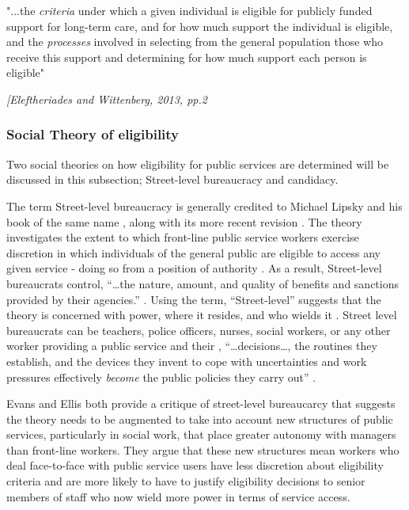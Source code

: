 \documentclass[12pt,]{report}
\begin{document}
\epigraph{"...the \emph{criteria} under which a given individual is eligible for publicly funded support for long-term care, and for how much support the individual is eligible, and the \emph{processes} involved in selecting from the general population those who receive this support and determining for how much support each person is eligible"}{\textit{[Eleftheriades and Wittenberg, 2013, pp.2}}

\subsubsection{Social Theory of eligibility}\label{subsubsec:eligibility-theory}

Two social theories on how eligibility for public services are
determined will be discussed in this subsection; Street-level
bureaucracy and candidacy.

The term Street-level bureaucracy is generally credited to Michael
Lipsky and his book of the same name \citeyearpar{RN174}, along with its
more recent revision \citep{RN430}. The theory investigates the extent
to which front-line public service workers exercise discretion in which
individuals of the general public are eligible to access any given
service - doing so from a position of authority \citep{RN430}. As a
result, Street-level bureaucrats control, ``\ldots{}the nature, amount,
and quality of benefits and sanctions provided by their agencies.''
\citep[pp.13]{RN430}. Using the term, ``Street-level'' suggests that the
theory is concerned with power, where it resides, and who wields it
\citep{RN428}. Street level bureaucrats can be teachers, police
officers, nurses, social workers, or any other worker providing a public
service \citep{RN428} and their , ``\ldots{}decisions\ldots{}, the
routines they establish, and the devices they invent to cope with
uncertainties and work pressures effectively \emph{become} the public
policies they carry out'' \citep[pp.xiii]{RN430}.

Evans\citeyearpar{RN424} and Ellis \citeyearpar{RN426} both provide a
critique of street-level bureaucarcy that suggests the theory needs to
be augmented to take into account new structures of public services,
particularly in social work, that place greater autonomy with managers
than front-line workers. They argue that these new structures mean
workers who deal face-to-face with public service users have less
discretion about eligibility criteria and are more likely to have to
justify eligibility decisions to senior members of staff who now wield
more power in terms of service access.
\end{document}
